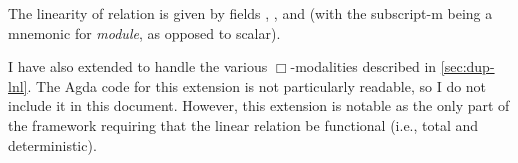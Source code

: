 The linearity of relation \AgdaBound{$\Psi$} is given by fields
, , and  (with
the subscript-m being a mnemonic for \emph{module}, as opposed to scalar).


I have also extended  to handle the various
$\Box$-modalities described in \cref{sec:dup-lnl}.
The Agda code for this extension is not particularly readable, so I do not
include it in this document.
However, this extension is notable as the only part of the framework requiring
that the linear relation \AgdaBound{$\Psi$} be functional (i.e., total and
deterministic).
